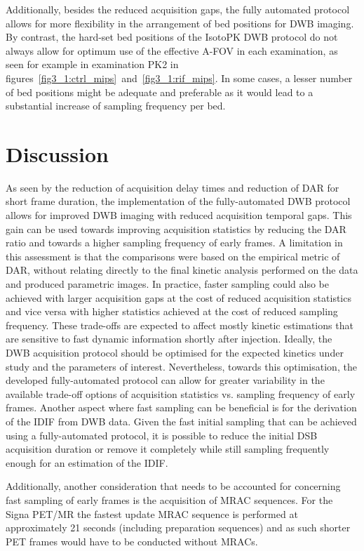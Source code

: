 Additionally, besides the reduced acquisition gaps, the fully automated protocol allows for more flexibility in the arrangement of bed positions for DWB imaging. By contrast, the hard-set bed positions of the IsotoPK DWB protocol do not always allow for optimum use of the effective A-FOV in each examination, as seen for example in examination PK2 in figures~\ref{fig3_1:ctrl_mips}~and~\ref{fig3_1:rif_mips}. In some cases, a lesser number of bed positions might be adequate and preferable as it would lead to a substantial increase of sampling frequency per bed.

\section{Discussion}

As seen by the reduction of acquisition delay times and reduction of DAR for short frame duration, the implementation of the fully-automated DWB protocol allows for improved DWB imaging with reduced acquisition temporal gaps.
%
This gain can be used towards improving acquisition statistics by reducing the DAR ratio and towards a higher sampling frequency of early frames. 
A limitation in this assessment is that the comparisons were based on the empirical metric of DAR, without relating directly to the final kinetic analysis performed on the data and produced parametric images. In practice, faster sampling could also be achieved with larger acquisition gaps at the cost of reduced acquisition statistics and vice versa with higher statistics achieved at the cost of reduced sampling frequency. 
These trade-offs are expected to affect mostly kinetic estimations that are sensitive to fast dynamic information shortly after injection. 
Ideally, the DWB acquisition protocol should be optimised for the expected kinetics under study and the parameters of interest. Nevertheless, towards this optimisation, the developed fully-automated protocol can allow for greater variability in the available trade-off options of acquisition statistics vs. sampling frequency of early frames. 
Another aspect where fast sampling can be beneficial is for the derivation of the IDIF from DWB data. Given the fast initial sampling that can be achieved using a fully-automated protocol, it is possible to reduce the initial DSB acquisition duration or remove it completely while still sampling frequently enough for an estimation of the IDIF.

Additionally, another consideration that needs to be accounted for concerning fast sampling of early frames is the acquisition of MRAC sequences.  For the Signa PET/MR the fastest update MRAC sequence is performed at approximately 21 seconds (including preparation sequences) and as such shorter PET frames would have to be conducted without MRACs.

